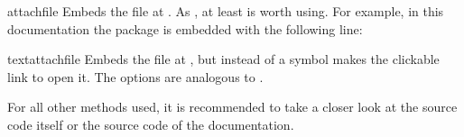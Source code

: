 \documentclass{sopra-base}
\begin{document}
\begin{command}{attachfile}{}
    Embeds the file at . As , at least  is worth using. For example, in this documentation the package is embedded with the following line:
\begin{plainlatex}
\end{plainlatex}
\end{command}

\begin{command}{textattachfile}{}
    Embeds the file at , but instead of a symbol makes  the clickable link to open it. The options are analogous to .
\end{command}

For all other methods used, it is recommended to take a closer look at the source code itself or the source code of the documentation.
\end{document}
